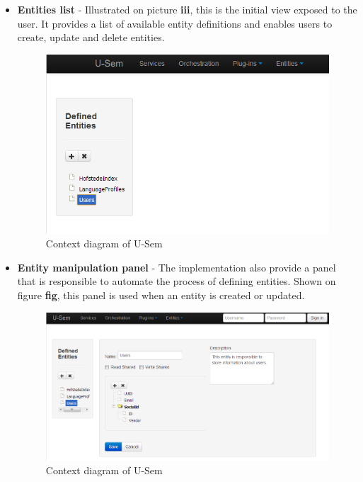 \documentclass[a4paper, notitlepage]{article}
\begin{document}
	\begin{itemize}
	
		\item \textbf{Entities list} - Illustrated on picture \textbf{iii}, this is the initial view exposed to the user. It provides a list of available entity definitions and enables users to create, update and delete entities.
		
\begin{figure}[h!]
  \centering
  	\includegraphics[scale=0.5]{ui/entityList.png}
  \caption{Context diagram of U-Sem }
  \label{fig_context}
\end{figure}
		
		\item \textbf{Entity manipulation panel} - The implementation also provide a panel that is responsible to automate the process of defining entities. Shown on figure \textbf{fig}, this panel is used when an entity is created or updated.
		
\begin{figure}[h!]
  \centering
  	\includegraphics[scale=0.5]{ui/entityPanel.png}
  \caption{Context diagram of U-Sem }
  \label{fig_context}
\end{figure}

	\end{itemize}
\end{document}
